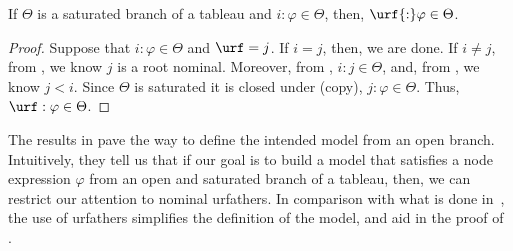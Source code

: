 

\begin{lem}\label{lemma:urfclos}
    If $\Theta$ is a saturated branch of a tableau and $i{:}\varphi \in \Theta$, then, $\urf{:}\varphi \in \Theta$.
\end{lem}
\begin{proof}
    Suppose that  $i{:}\varphi\in\Theta$ and $\urf=j$.
    If $i = j$, then, we are done.
    If $i \neq j$, from , we know $j$ is a root nominal.
    Moreover, from ,  $i{:}j \in \Theta$, and, from , we know $j < i$.
    Since $\Theta$ is saturated it is closed under (copy), $j{:}\varphi\in\Theta$.
    Thus, $\urf:\varphi \in \Theta$.
\end{proof}

The results in  pave the way to define the intended model from an open branch.
Intuitively, they tell us that if our goal is to build a model that satisfies a node expression $\varphi$ from an open and saturated branch of a tableau, then, we can restrict our attention to nominal urfathers.
In comparison with what is done in~\cite{ArecesFS17}, the use of urfathers simplifies the definition of the model, and aid in the proof of .

